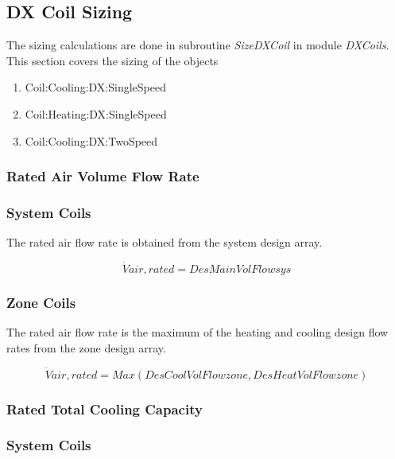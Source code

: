 \subsection{DX Coil Sizing}\label{dx-coil-sizing}

The sizing calculations are done in subroutine \emph{SizeDXCoil} in module \emph{DXCoils}. This section covers the sizing of the objects

\begin{enumerate}
\def\labelenumi{\arabic{enumi}.}
\item
  Coil:Cooling:DX:SingleSpeed
\item
  Coil:Heating:DX:SingleSpeed
\item
  Coil:Cooling:DX:TwoSpeed
\end{enumerate}

\subsubsection{Rated Air Volume Flow Rate}\label{rated-air-volume-flow-rate}

\subsubsection{System Coils}\label{system-coils-4}

The rated air flow rate is obtained from the system design array.

\begin{equation}
\dot Vair,rated = DesMainVolFlowsys
\end{equation}

\subsubsection{Zone Coils}\label{zone-coils-4}

The rated air flow rate is the maximum of the heating and cooling design flow rates from the zone design array.

\begin{equation}
\dot Vair,rated = Max(DesCoolVolFlowzone,DesHeatVolFlowzone)
\end{equation}

\subsubsection{Rated Total Cooling Capacity}\label{rated-total-cooling-capacity-2}

\subsubsection{System Coils}\label{system-coils-5}

